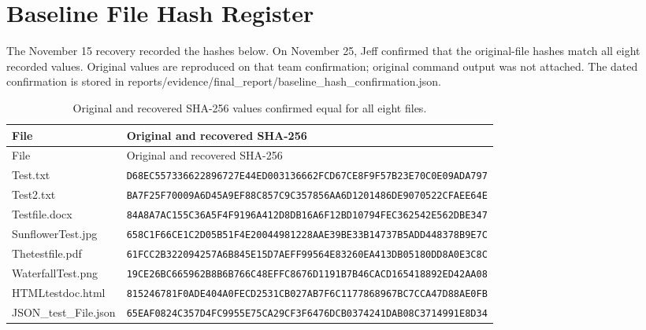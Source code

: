 \section{Baseline File Hash Register}
The November 15 recovery recorded the hashes below. On November 25, Jeff confirmed that the original-file hashes match all eight recorded values. Original values are reproduced on that team confirmation; original command output was not attached. The dated confirmation is stored in reports/evidence/final\_report/baseline\_hash\_confirmation.json.
\begin{longtable}{p{1.6in}p{4.4in}}
\caption{Original and recovered SHA-256 values confirmed equal for all eight files.}\\
\toprule File & Original and recovered SHA-256\\\midrule\endfirsthead
\toprule File & Original and recovered SHA-256\\\midrule\endhead
Test.txt & \texttt{D68EC557336622896727E44ED0031366}\newline\texttt{62FCD67CE8F9F57B23E70C0E09ADA797}\\[0.6em]
Test2.txt & \texttt{BA7F25F70009A6D45A9EF88C857C9C35}\newline\texttt{7856AA6D1201486DE9070522CFAEE64E}\\[0.6em]
Testfile.docx & \texttt{84A8A7AC155C36A5F4F9196A412D8DB1}\newline\texttt{6A6F12BD10794FEC362542E562DBE347}\\[0.6em]
SunflowerTest.jpg & \texttt{658C1F66CE1C2D05B51F4E2004498122}\newline\texttt{8AAE39BE33B14737B5ADD448378B9E7C}\\[0.6em]
Thetestfile.pdf & \texttt{61FCC2B322094257A6B845E15D7AEFF9}\newline\texttt{9564E83260EA413DB05180DD8A0E3C8C}\\[0.6em]
WaterfallTest.png & \texttt{19CE26BC665962B8B6B766C48EFFC867}\newline\texttt{6D1191B7B46CACD165418892ED42AA08}\\[0.6em]
HTMLtestdoc.html & \texttt{815246781F0ADE404A0FECD2531CB027}\newline\texttt{AB7F6C1177868967BC7CCA47D88AE0FB}\\[0.6em]
JSON\_test\_File.json & \texttt{65EAF0824C357D4FC9955E75CA29CF3F}\newline\texttt{6476DCB0374241DAB08C3714991E8D34}\\[0.6em]
\bottomrule\end{longtable}
